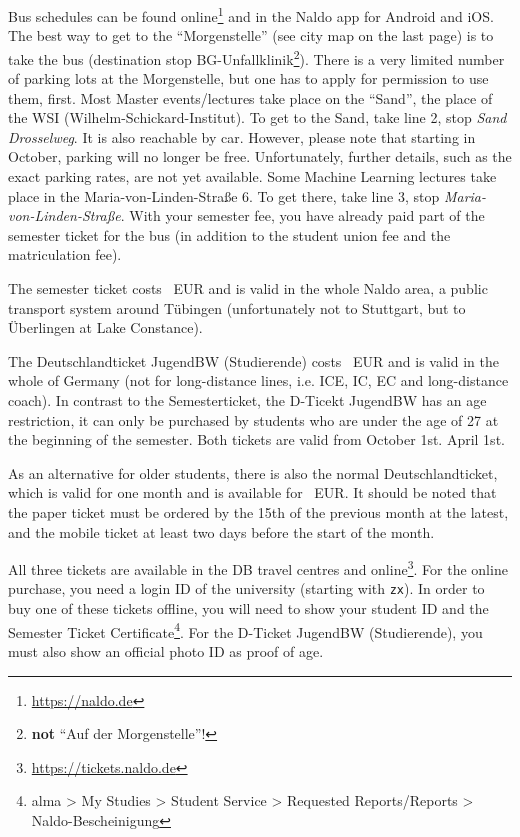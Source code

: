\ifml
    Bus schedules can be found online\footnote{\url{https://naldo.de}} and in the Naldo app for Android and iOS.\\
    The best way to get to the "`Morgenstelle"' (see city map on the last page) is to take the bus (destination stop BG-Unfallklinik\footnote{\textbf{not} "`Auf der Morgenstelle"'!}). There is a very limited number of parking lots at the Morgenstelle, but one has to apply for permission to use them, first.
    Most Master events/lectures take place on the "`Sand"', the place of the WSI (Wilhelm-Schickard-Institut). To get to the Sand, take line 2, stop \emph{Sand Drosselweg}.  It is also reachable by car. However, please note that starting in October, parking will no longer be free. Unfortunately, further details, such as the exact parking rates, are not yet available.
    Some Machine Learning lectures take place in the Maria-von-Linden-Straße 6. To get there, take line 3, stop \emph{Maria-von-Linden-Straße}.
    With your semester fee, you have already paid part of the semester ticket for the bus (in addition to the student union fee and the matriculation fee).
    
    The semester ticket costs \semesterticketpreis~EUR and is valid in the whole Naldo area, a public transport system around
    Tübingen (unfortunately not to Stuttgart, but to Überlingen at Lake Constance).
    
    The Deutschlandticket JugendBW (Studierende) costs \jugendticketbwpreis~EUR and is valid in the whole of Germany (not for long-distance lines, i.e. ICE, IC, EC and long-distance coach).
    In contrast to the Semesterticket, the D-Ticekt JugendBW has an age restriction, it can only be purchased by students who are under the age of 27 at the beginning of the semester.
    Both tickets are valid from
    \ifwintersemester
    October 1st.
    \fi
    \ifsommersemester
    April 1st.
    \fi

    As an alternative for older students, there is also the normal Deutschlandticket, which is valid for one month and is available for \detickettuepreis~EUR. 
    It should be noted that the paper ticket must be ordered by the 15th of the previous month at the latest, and the mobile ticket at least two days before the start of the month.

    All three tickets are available in the DB travel centres and online\footnote{\url{https://tickets.naldo.de}}. For the online purchase, you need a login ID of the university (starting with \texttt{zx}).
    In order to buy one of these tickets offline, you will need to show your student ID and the Semester Ticket Certificate\footnote{alma > My Studies > Student Service > Requested Reports/Reports > Naldo-Bescheinigung}. For the D-Ticket JugendBW (Studierende), you must also show an official photo ID as proof of age.\\
    
